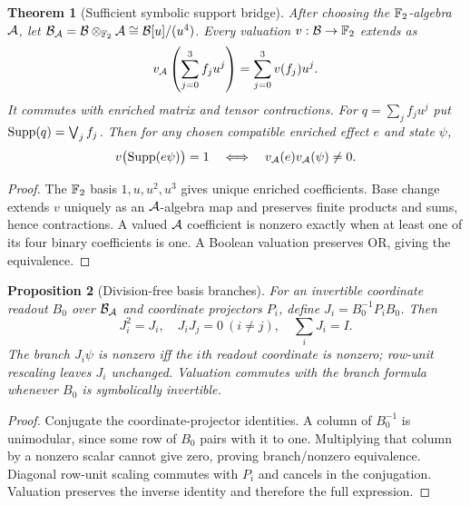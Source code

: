 \documentclass[11pt]{article}
\newtheorem{theorem}{Theorem}[section]
\newtheorem{proposition}[theorem]{Proposition}
\theoremstyle{remark}
\begin{document}
\begin{theorem}[Sufficient symbolic support bridge]
After choosing the $\mathbb F_2$-algebra $\mathcal A$, let
$\mathcal B_\mathcal A=\mathcal B\otimes_{\mathbb F_2}\mathcal A\cong\mathcal B[u]/(u^4)$.
Every valuation $v:\mathcal B\to\mathbb F_2$ extends as
\[
 v_\mathcal A\left(\sum_{j=0}^3 f_j u^j\right)
 =\sum_{j=0}^3v(f_j)u^j.
\]
It commutes with enriched matrix and tensor contractions. For
$q=\sum_j f_j u^j$ put $\operatorname{Supp}(q)=\bigvee_j f_j$. Then for any chosen
compatible enriched effect $e$ and state $\psi$,
\[
 v\bigl(\operatorname{Supp}(e\psi)\bigr)=1
 \quad\Longleftrightarrow\quad v_\mathcal A(e)v_\mathcal A(\psi)\ne0.
\]
\end{theorem}
\begin{proof}
The $\mathbb F_2$ basis $1,u,u^2,u^3$ gives unique enriched coefficients. Base change
extends $v$ uniquely as an $\mathcal A$-algebra map and preserves finite products and
sums, hence contractions. A valued $\mathcal A$ coefficient is nonzero exactly when at
least one of its four binary coefficients is one. A Boolean valuation preserves
OR, giving the equivalence.
\end{proof}

\begin{proposition}[Division-free basis branches]
For an invertible coordinate readout $B_0$ over $\mathcal B_\mathcal A$ and coordinate
projectors $P_i$, define $J_i=B_0^{-1}P_iB_0$. Then
\[
 J_i^2=J_i,\quad J_iJ_j=0\ (i\ne j),\quad\sum_iJ_i=I.
\]
The branch $J_i\psi$ is nonzero iff the $i$th readout coordinate is nonzero;
row-unit rescaling leaves $J_i$ unchanged. Valuation commutes with the branch
formula whenever $B_0$ is symbolically invertible.
\end{proposition}
\begin{proof}
Conjugate the coordinate-projector identities. A column of $B_0^{-1}$ is
unimodular, since some row of $B_0$ pairs with it to one. Multiplying that column
by a nonzero scalar cannot give zero, proving branch/nonzero equivalence.
Diagonal row-unit scaling commutes with $P_i$ and cancels in the conjugation.
Valuation preserves the inverse identity and therefore the full expression.
\end{proof}
\end{document}
